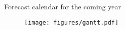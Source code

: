 \begin{frame}{Forecast calendar for the coming year}

    \begin{figure}[ht]
        \hspace{-7ex}
        \texttt{[image: figures/gantt.pdf]}
    \end{figure}

\end{frame}
